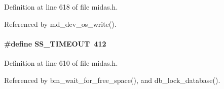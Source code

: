 \begin{DoxyItemize}
\item 
\end{DoxyItemize}

Definition at line 618 of file midas.h.

Referenced by md\_\-dev\_\-os\_\-write().
\paragraph[{SS\_\-TIMEOUT}]{\setlength{\rightskip}{0pt plus 5cm}\#define SS\_\-TIMEOUT~412}\hfill\label{group__err24_ga4ceb5b10e3abde2c178d87192664044f}

\begin{DoxyItemize}
\item 
\end{DoxyItemize}

Definition at line 610 of file midas.h.

Referenced by bm\_\-wait\_\-for\_\-free\_\-space(), and db\_\-lock\_\-database().